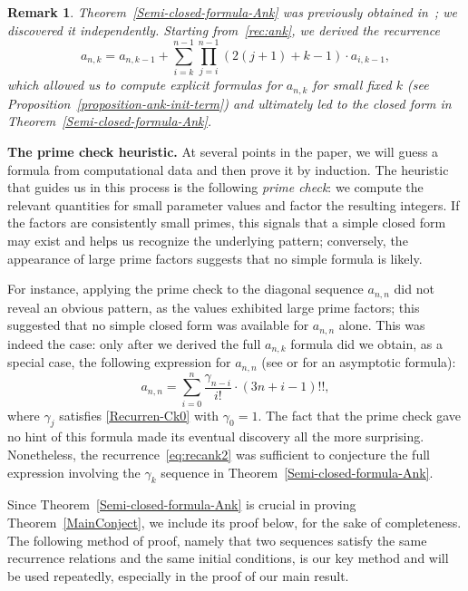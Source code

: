 \documentclass[reqno, 12pt]{article}
\theoremstyle{mydefinition}
\theoremstyle{myremark}
\newtheorem{rem}[thm]{Remark}
\numberwithin{algorithm}{section}
\begin{document}
\begin{rem}
Theorem~\ref{Semi-closed-formula-Ank} was previously obtained in~\cite[Proposition~6]{PB}; we discovered it independently.
Starting from~\eqref{rec:ank}, we derived the recurrence
\begin{equation}\label{eq:recank2}
a_{n,k}=a_{n,k-1}+\sum_{i=k}^{n-1}\prod_{j=i}^{n-1}(2(j+1)+k-1)\cdot a_{i,k-1},
\end{equation}
which allowed us to compute explicit formulas for $a_{n,k}$ for small fixed $k$ (see Proposition~\ref{proposition-ank-init-term}) and ultimately led to the closed form in Theorem~\ref{Semi-closed-formula-Ank}.
\end{rem}

\medskip
\noindent
\textbf{The prime check heuristic.}
At several points in the paper, we will guess a formula from computational data and then prove it by induction.
The heuristic that guides us in this process is the following \emph{prime check}: we compute the relevant quantities for small parameter values and factor the resulting integers.
If the factors are consistently small primes, this signals that a simple closed form may exist and helps us recognize the underlying pattern; conversely, the appearance of large prime factors suggests that no simple formula is likely.

For instance, applying the prime check to the diagonal sequence $a_{n,n}$ did not reveal an obvious pattern, as the values exhibited large prime factors; this suggested that no simple closed form was available for $a_{n,n}$ alone.
This was indeed the case: only after we derived the full $a_{n,k}$ formula did we obtain, as a special case, the following expression for $a_{n,n}$ (see \cite{FYZ} or \cite{C.Banderier21} for an asymptotic formula):
\begin{equation*}
a_{n,n}=\sum_{i=0}^n \frac{\gamma_{n-i}}{i!}\cdot (3n+i-1)!!,
\end{equation*}
where $\gamma_j$ satisfies \eqref{Recurren-Ck0} with $\gamma_0=1$.
The fact that the prime check gave no hint of this formula made its eventual discovery all the more surprising.
Nonetheless, the recurrence~\eqref{eq:recank2} was sufficient to conjecture the full expression involving the $\gamma_k$ sequence in Theorem~\ref{Semi-closed-formula-Ank}.


Since Theorem~\ref{Semi-closed-formula-Ank} is crucial in proving Theorem~\ref {MainConject}, we include its proof below, for the sake of completeness.
The following method of proof, namely that two sequences satisfy the same recurrence relations and the same initial conditions, is our key method and will be used repeatedly, especially in the proof of our main result.
\end{document}
